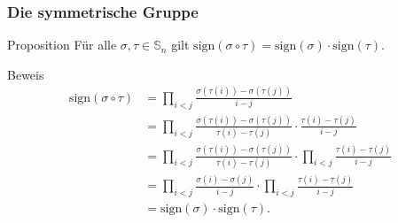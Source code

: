 \documentclass{beamer}
\renewcommand\SS{\mathbb S}
\newcommand\sign{\mathrm{sign}}
\newcommand{\ue}{\"u}
\begin{document}
\begin{frame}\frametitle{Die symmetrische Gruppe}
	\begin{block}{Proposition}
		F\ue r alle $\sigma,\tau\in\SS_n$ gilt	$\sign(\sigma\circ\tau)=\sign(\sigma)\cdot\sign(\tau).$
	\end{block}
	\begin{block}{Beweis}
		\begin{align*}
			\sign(\sigma\circ\tau)&=\prod_{i<j}\frac{\sigma(\tau(i))-\sigma(\tau(j))}{i-j}\\
								  &=\prod_{i<j}\frac{\sigma(\tau(i))-\sigma(\tau(j))}{\tau(i)-\tau(j)}\cdot\frac{\tau(i)-\tau(j)}{i-j}\\
								  &=\prod_{i<j}\frac{\sigma(\tau(i))-\sigma(\tau(j))}{\tau(i)-\tau(j)}\cdot\prod_{i<j}\frac{\tau(i)-\tau(j)}{i-j}\\
								  &=\prod_{i<j}\frac{\sigma(i)-\sigma(j)}{i-j}\cdot\prod_{i<j}\frac{\tau(i)-\tau(j)}{i-j}\\
								  &=\sign(\sigma)\cdot\sign(\tau).
		\end{align*}	
	\end{block}
\end{frame}
\end{document}
